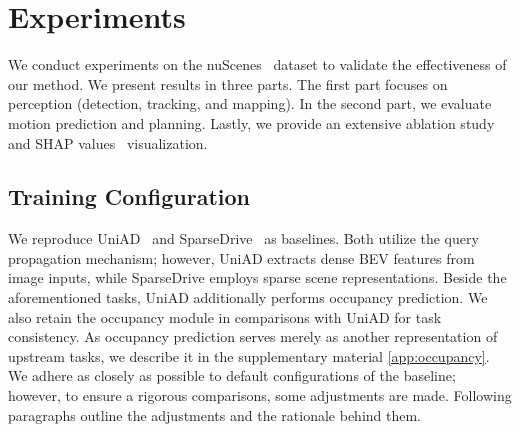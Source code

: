 \section{Experiments}
\label{sec:experiments}

We conduct experiments on the nuScenes~\cite{caesar2020nuscenes} dataset to validate the effectiveness of our method. We present results in three parts. The first part focuses on perception (detection, tracking, and mapping).
In the second part, we evaluate motion prediction and planning.
Lastly, we provide an extensive ablation study and SHAP values~\cite{NIPS2017_7062} visualization.

\subsection{Training Configuration} 
\label{subsec:training_configuration}
We reproduce UniAD~\cite{hu2023planning} and SparseDrive~\cite{sun2024sparsedrive} as baselines. Both utilize the query propagation mechanism; however, UniAD extracts dense \gls{BEV} features from image inputs, while SparseDrive employs sparse scene representations. Beside the aforementioned tasks, UniAD additionally performs occupancy prediction. We also retain the occupancy module in comparisons with UniAD for task consistency. As occupancy prediction serves merely as another representation of upstream tasks, we describe it in the supplementary material \cref{app:occupancy}.
We adhere as closely as possible to default configurations of the baseline; however, to ensure a rigorous comparisons, some adjustments are made. Following paragraphs outline the adjustments and the rationale behind them.\\


